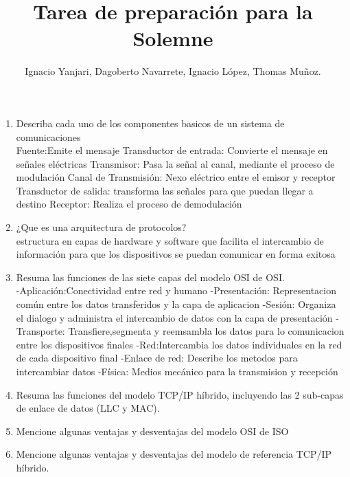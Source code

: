 \documentclass{udparticle}
\title{Tarea de preparación para la Solemne}
\author{Ignacio Yanjari, Dagoberto Navarrete, Ignacio López, Thomas Muñoz.}
\begin{document}
\maketitle
\begin{enumerate}

\item Describa cada uno de los componentes basicos de un sistema de comunicaciones \\
    Fuente:Emite el mensaje
    Transductor de entrada: Convierte el mensaje en señales eléctricas
    Transmisor: Pasa la señal al canal, mediante el proceso de modulación
    Canal de Transmisión: Nexo eléctrico entre el emisor y receptor
    Transductor de salida: transforma las señales para que puedan llegar a destino
    Receptor: Realiza el proceso de demodulación 

\item ¿Que es una arquitectura de protocolos? \\
    estructura en capas de hardware y software que facilita el intercambio de información para que los
    dispositivos se puedan comunicar en forma exitosa

\item Resuma las funciones de las siete capas del modelo OSI de OSI.\\
    -Aplicación:Conectividad entre red y humano
    -Presentación: Representacion común entre los datos transferidos y la capa de aplicacion
    -Sesión: Organiza el dialogo y administra el intercambio de datos con la capa de presentación
    -Transporte: Transfiere,segmenta y reemsambla los datos para lo comunicacion entre los dispositivos finales
    -Red:Intercambia los datos individuales en la red de cada dispositivo final
    -Enlace de red: Describe los metodos para intercambiar datos
    -Física: Medios mecánico para la transmision y recepción
\item Resuma las funciones del modelo TCP/IP híbrido, incluyendo las 2 sub-capas de enlace de datos
(LLC y MAC).\\

\item Mencione algunas ventajas y desventajas del modelo OSI de ISO\\
    
\item Mencione algunas ventajas y desventajas del modelo de referencia TCP/IP híbrido.\\


\end{enumerate}
\end{document}
